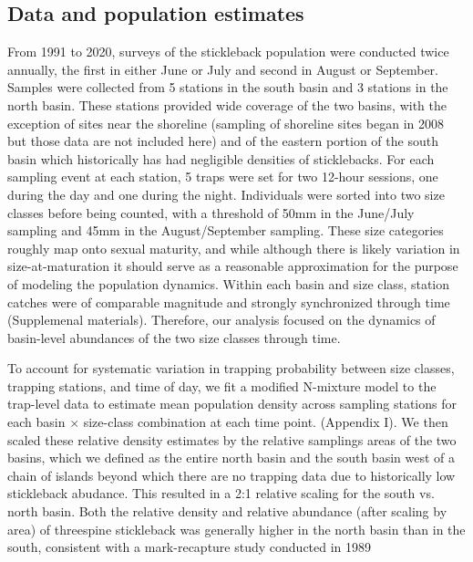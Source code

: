 \documentclass[11pt]{article}
\begin{document}
\subsection*{Data and population estimates} 

From 1991 to 2020, surveys of the stickleback population were conducted twice annually, 
the first in either June or July and second in August or September. 
Samples were collected from 5 stations in the south basin and 3 stations in the north basin.
These stations provided wide coverage of the two basins, 
with the exception of sites near the shoreline 
(sampling of shoreline sites began in 2008 but those data are not included here)
and of the eastern portion of the south basin which historically has had negligible 
densities of sticklebacks.
For each sampling event at each station, 
5 traps were set for two 12-hour sessions, 
one during the day and one during the night.
Individuals were sorted into two size classes before being counted,
with a threshold of 50mm in the June/July sampling and 45mm in the August/September sampling.
These size categories roughly map onto sexual maturity,
and while although there is likely variation in size-at-maturation \citep{singkam2019}
it should serve as a reasonable approximation for the purpose 
of modeling the population dynamics.
Within each basin and size class, 
station catches were of comparable magnitude and 
strongly synchronized through time (Supplemenal materials).
Therefore, our analysis focused on the dynamics of basin-level abundances
of the two size classes through time.

To account for systematic variation in trapping probability between size classes,
trapping stations, and time of day, 
we fit a modified N-mixture model \citep{royle2004}
to the trap-level data to estimate mean population density across sampling stations 
for each basin $\times$ size-class combination at each time point.
(Appendix I). 
We then scaled these relative density estimates by the relative samplings areas 
of the two basins, 
which we defined as the entire north basin and the south basin west of a chain
of islands beyond which there are no trapping data 
due to historically low stickleback abudance.
This resulted in a 2:1 relative scaling for the south vs. north basin.
Both the relative density and relative abundance (after scaling by area) of threespine
stickleback was generally higher in the north basin than in the south,
consistent with a mark-recapture study conducted in 1989 \citep{gislason1998}
\end{document}
